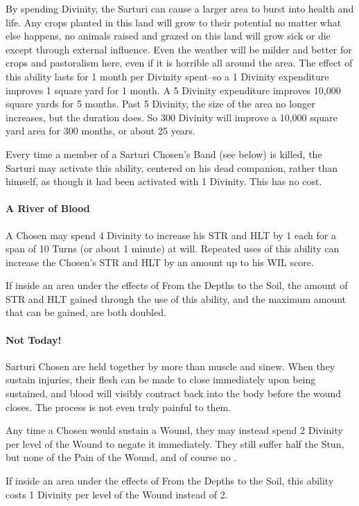 \documentclass[oneside,11pt,english]{book}
\begin{document}
By spending Divinity, the Sarturi can cause a larger area to burst into health and life. Any crops 
planted in this land will grow to their potential no matter what else happens, no animals raised 
and grazed on this land will grow sick or die except through external influence. Even the weather 
will be milder and better for crops and pastoralism here, even if it is horrible all around the area. 
The effect of this ability lasts for 1 month per Divinity spent--so a 1 Divinity expenditure 
improves 1 square yard for 1 month. A 5 Divinity expenditure improves 10,000 square yards for 5 
months. Past 5 Divinity, the size of the area no longer increases, but the duration does. So 300 
Divinity will improve a 10,000 square yard area for 300 months, or about 25 years. 


Every time a member of a Sarturi Chosen's Band (see below) is killed, the Sarturi may activate this ability, centered on his dead companion, rather than himself, as though it had been activated 
with 1 Divinity. This has no cost.
\paragraph{A River of Blood}
A Chosen may spend 4 Divinity to increase his STR and HLT by 1 each for a span of 10 Turns 
(or about 1 minute) at will. Repeated uses of this ability can increase the Chosen's STR and HLT 
by an amount up to his WIL score. 


If inside an area under the effects of From the Depths to the Soil, the amount of STR and HLT 
gained through the use of this ability, and the maximum amount that can be gained, are both 
doubled.
\paragraph{Not Today!}
Sarturi Chosen are held together by more than muscle and sinew. When they sustain injuries, 
their flesh can be made to close immediately upon being sustained, and blood will visibly contract 
back into the body before the wound closes. The process is not even truly painful to them. 


Any time a Chosen would sustain a Wound, they may instead spend 2 Divinity per level of the 
Wound to negate it immediately. They still suffer half the Stun, but none of the Pain of the 
Wound, and of course no . 


If inside an area under the effects of From the Depths to the Soil, this ability costs 1 Divinity per 
level of the Wound instead of 2. 
\end{document}
